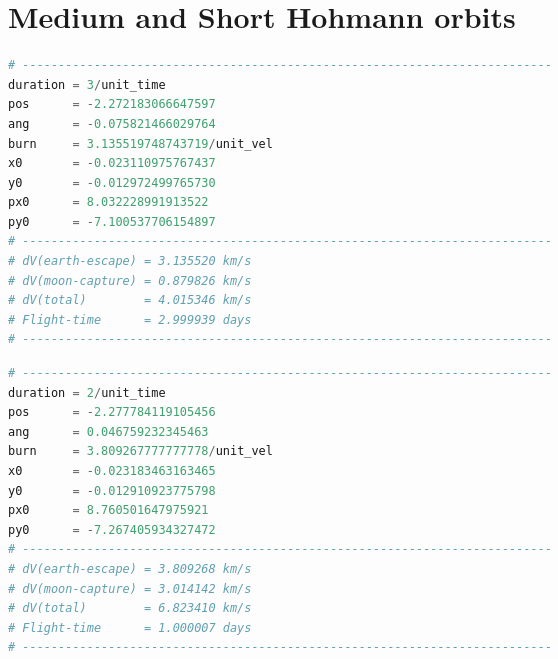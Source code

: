 \section{Medium and Short Hohmann orbits} \label{app:more_hohmann}
\begin{adjustwidth*}{0cm}{-0.4cm}
\begin{lstlisting}[language=Python,caption=Medium duration Hohmann]
# --------------------------------------------------------------------------
duration = 3/unit_time
pos      = -2.272183066647597
ang      = -0.075821466029764
burn     = 3.135519748743719/unit_vel
x0       = -0.023110975767437
y0       = -0.012972499765730
px0      = 8.032228991913522
py0      = -7.100537706154897
# --------------------------------------------------------------------------
# dV(earth-escape) = 3.135520 km/s
# dV(moon-capture) = 0.879826 km/s
# dV(total)        = 4.015346 km/s
# Flight-time      = 2.999939 days
# --------------------------------------------------------------------------
\end{lstlisting}
\end{adjustwidth*}


\begin{adjustwidth*}{0cm}{-0.4cm}
\begin{lstlisting}[language=Python,caption=Fast duration Hohmann]
# --------------------------------------------------------------------------
duration = 2/unit_time
pos      = -2.277784119105456
ang      = 0.046759232345463
burn     = 3.809267777777778/unit_vel
x0       = -0.023183463163465
y0       = -0.012910923775798
px0      = 8.760501647975921
py0      = -7.267405934327472
# --------------------------------------------------------------------------
# dV(earth-escape) = 3.809268 km/s
# dV(moon-capture) = 3.014142 km/s
# dV(total)        = 6.823410 km/s
# Flight-time      = 1.000007 days
# --------------------------------------------------------------------------
\end{lstlisting}
\end{adjustwidth*}
